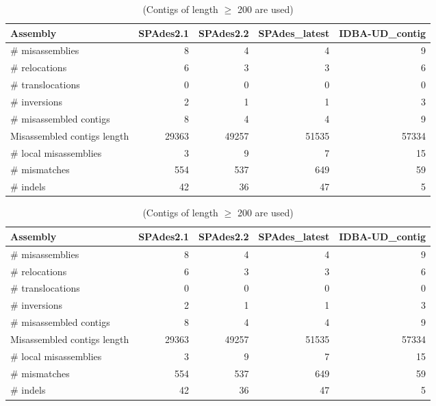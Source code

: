 \begin{table}[ht]
\begin{center}
\caption{(Contigs of length $\geq$ 200 are used)}
\begin{tabular}{|l*{4}{|r}|}
\hline
Assembly & SPAdes2.1 & SPAdes2.2 & SPAdes\_latest & IDBA-UD\_contig \\ \hline
\# misassemblies & 8 & 4 & 4 & 9 \\ \hline
    \# relocations & 6 & 3 & 3 & 6 \\ \hline
    \# translocations & 0 & 0 & 0 & 0 \\ \hline
    \# inversions & 2 & 1 & 1 & 3 \\ \hline
\# misassembled contigs & 8 & 4 & 4 & 9 \\ \hline
Misassembled contigs length & 29363 & 49257 & 51535 & 57334 \\ \hline
\# local misassemblies & 3 & 9 & 7 & 15 \\ \hline
\# mismatches & 554 & 537 & 649 & 59 \\ \hline
\# indels & 42 & 36 & 47 & 5 \\ \hline
\end{tabular}
\end{center}
\end{table}
\begin{table}[ht]
\begin{center}
\caption{(Contigs of length $\geq$ 200 are used)}
\begin{tabular}{|l*{4}{|r}|}
\hline
Assembly & SPAdes2.1 & SPAdes2.2 & SPAdes\_latest & IDBA-UD\_contig \\ \hline
\# misassemblies & 8 & 4 & 4 & 9 \\ \hline
    \# relocations & 6 & 3 & 3 & 6 \\ \hline
    \# translocations & 0 & 0 & 0 & 0 \\ \hline
    \# inversions & 2 & 1 & 1 & 3 \\ \hline
\# misassembled contigs & 8 & 4 & 4 & 9 \\ \hline
Misassembled contigs length & 29363 & 49257 & 51535 & 57334 \\ \hline
\# local misassemblies & 3 & 9 & 7 & 15 \\ \hline
\# mismatches & 554 & 537 & 649 & 59 \\ \hline
\# indels & 42 & 36 & 47 & 5 \\ \hline
\end{tabular}
\end{center}
\end{table}
